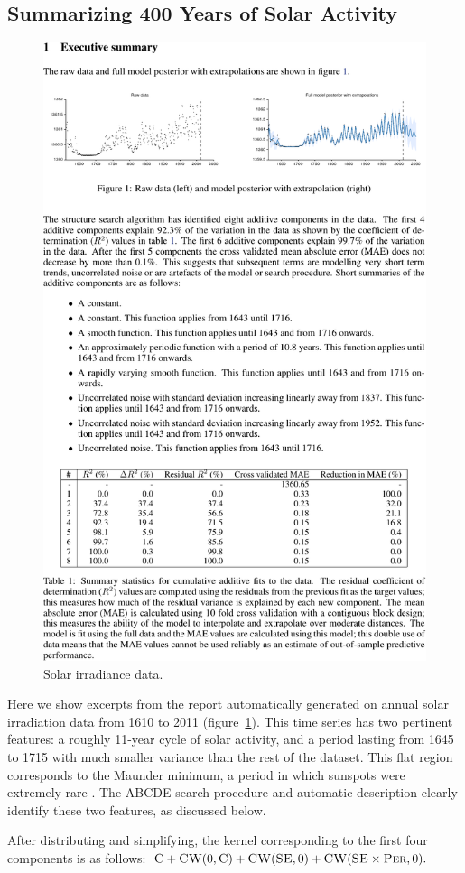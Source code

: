 \documentclass[letterpaper]{article}
\let\emptyset 0
\newcommand{\procedurename}{ABCDE}
\begin{document}
\subsection{Summarizing 400 Years of Solar Activity}
\label{sec:solar}

\begin{figure}[h]
\centering
\includegraphics[trim=0.2cm 18.0cm 8cm 2cm, clip, width=0.98\columnwidth, height=0.45\columnwidth]{solarpages/pg_0002-crop}
\caption{
Solar irradiance data.}
\label{fig:solar}
\end{figure}

Here we show excerpts from the report automatically generated on annual solar irradiation data from 1610 to 2011 (figure~\ref{fig:solar}).
This time series has two pertinent features: a roughly 11-year cycle of solar activity, and a period lasting from 1645 to 1715 with much smaller variance than the rest of the dataset.  This flat region corresponds to the Maunder minimum, a period in which sunspots were extremely rare \citep{lean1995reconstruction}.
The \procedurename{} search procedure and automatic description clearly identify these two features, as discussed below.

After distributing and simplifying, the kernel corresponding to the first four components is as follows:
$\kC + \kCW(\emptyset,\kC) + \kCW(\kSE,\emptyset) + \kCW(\kSE \times \kPer,\emptyset).$
\end{document}
